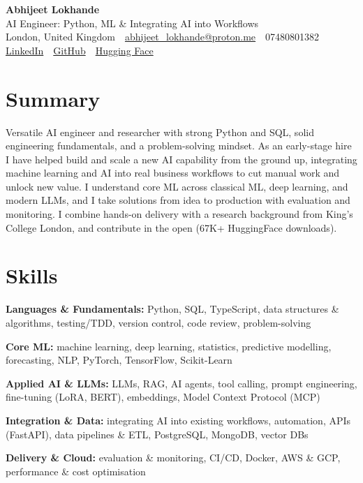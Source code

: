 \documentclass[10pt,a4paper]{article}
\newcommand{\sep}{\,\textcolor{accent!60}{\textbar}\,}
\begin{document}
\begin{center}
  {\fontsize{24}{26}\selectfont\bfseries Abhijeet Lokhande}\\[3pt]
  {\color{accent}\large AI Engineer: Python, ML \& Integrating AI into Workflows}\\[5pt]
  {\small
    London, United Kingdom \sep
    \href{mailto:abhijeet_lokhande@proton.me}{abhijeet\_lokhande@proton.me} \sep
    07480801382 \\[2pt]
    \href{https://www.linkedin.com/in/ablds/}{LinkedIn} \sep
    \href{https://github.com/abhijeetscode}{GitHub} \sep
    \href{https://huggingface.co/ab-ai}{Hugging Face}
  }
\end{center}
\vspace{2pt}

\section{Summary}
Versatile AI engineer and researcher with strong Python and SQL, solid engineering fundamentals, and a problem-solving mindset. As an early-stage hire I have helped build and scale a new AI capability from the ground up, integrating machine learning and AI into real business workflows to cut manual work and unlock new value. I understand core ML across classical ML, deep learning, and modern LLMs, and I take solutions from idea to production with evaluation and monitoring. I combine hands-on delivery with a research background from King's College London, and contribute in the open (67K+ HuggingFace downloads).

\section{Skills}
\begin{tight}
  \item[\textcolor{accent}{\small$\bullet$}] \textbf{Languages \& Fundamentals:} Python, SQL, TypeScript, data structures \& algorithms, testing/TDD, version control, code review, problem-solving
  \item[\textcolor{accent}{\small$\bullet$}] \textbf{Core ML:} machine learning, deep learning, statistics, predictive modelling, forecasting, NLP, PyTorch, TensorFlow, Scikit-Learn
  \item[\textcolor{accent}{\small$\bullet$}] \textbf{Applied AI \& LLMs:} LLMs, RAG, AI agents, tool calling, prompt engineering, fine-tuning (LoRA, BERT), embeddings, Model Context Protocol (MCP)
  \item[\textcolor{accent}{\small$\bullet$}] \textbf{Integration \& Data:} integrating AI into existing workflows, automation, APIs (FastAPI), data pipelines \& ETL, PostgreSQL, MongoDB, vector DBs
  \item[\textcolor{accent}{\small$\bullet$}] \textbf{Delivery \& Cloud:} evaluation \& monitoring, CI/CD, Docker, AWS \& GCP, performance \& cost optimisation
\end{tight}
\end{document}
